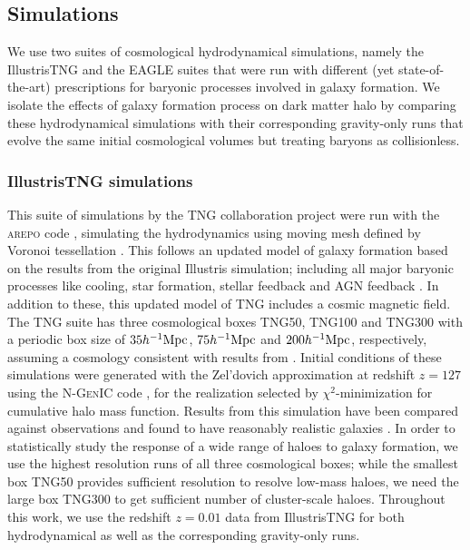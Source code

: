 \subsection{Simulations}
We use two suites of cosmological hydrodynamical simulations, namely the IllustrisTNG \citep[][]{2019ComAC...6....2N} and the EAGLE \citep[][]{2017arXiv170609899T} suites that were run with different (yet state-of-the-art) prescriptions for baryonic processes involved in galaxy formation. We isolate the effects of galaxy formation process on dark matter halo by comparing these hydrodynamical simulations with their corresponding gravity-only runs that evolve the same initial cosmological volumes but treating baryons as collisionless.

\subsubsection{IllustrisTNG simulations}
This suite of simulations by the TNG collaboration project were run with the \textsc{arepo} code \citep[][]{2020ApJS..248...32W}, simulating the hydrodynamics using moving mesh defined by Voronoi tessellation \citep[][]{2010MNRAS.401..791S}. This follows an updated model of galaxy formation based on the results from the original Illustris simulation; including all major baryonic processes like cooling, star formation, stellar feedback and AGN feedback 
\citep[see][for details]{2017MNRAS.465.3291W,2018MNRAS.473.4077P}. In addition to these, this updated model of TNG includes a cosmic magnetic field.
The TNG suite has three cosmological boxes TNG50, TNG100 and TNG300 with a periodic box size of $35 h^{-1}{\rm Mpc}$, $75 h^{-1}{\rm Mpc}$ and $200 h^{-1}{\rm Mpc}$, respectively, assuming a cosmology consistent with results from \cite{2016A&A...594A..13P}. Initial conditions of these simulations were generated with the Zel'dovich approximation \citep[][]{1970A&A.....5...84Z} at redshift $z=127$ using the \textsc{N-GenIC} code \citep[][]{2015ascl.soft02003S}, for the realization selected by $\chi^2$-minimization for cumulative halo mass function. 
Results from this simulation have been compared against observations and found to have reasonably realistic galaxies \citep[see][]{2018MNRAS.475..624N,2018MNRAS.475..648P,2018MNRAS.475..676S,2018MNRAS.477.1206N,2018MNRAS.480.5113M,2019MNRAS.490.3196P,2019MNRAS.490.3234N}.
In order to statistically study the response of a wide range of haloes to galaxy formation, we use the highest resolution runs of all three cosmological boxes; while the smallest box TNG50 provides sufficient resolution to resolve low-mass haloes, we need the large box TNG300 to get sufficient number of cluster-scale haloes. 
Throughout this work, we use the redshift $z=0.01$ data 
from IllustrisTNG for both hydrodynamical as well as the corresponding gravity-only runs.



